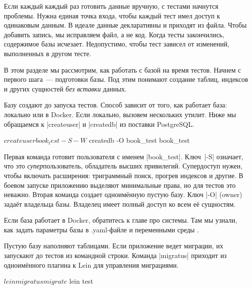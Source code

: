 Если каждый каждый раз готовить данные вручную, с тестами начнутся
проблемы. Нужна единая точка входа, чтобы каждый тест имел доступ к одинаковым
данным. В идеале данные декларативны и приходят из файла. Чтобы добавить запись,
мы исправляем файл, а не код. Когда тесты закончились, содержимое базы
исчезает. Недопустимо, чтобы тест зависел от изменений, выполненных в другом
тесте.

В этом разделе мы рассмотрим, как работать с базой на время тестов. Начнем с
первого шага~--- подготовки базы. Под этим понимают создание таблиц, индексов и
других сущностей \emph{без вставки} данных.


Базу создают до запуска тестов. Способ зависит от того, как работает база:
локально или в Docker. Если локально, вызовем нескольких утилит. Ниже мы
обращаемся к \spverb|createuser| и \spverb|createdb| из поставки PostgreSQL.

\begin{english}
  \begin{bash}
$ createuser book_test -S -W
$ createdb -O book_test book_test
  \end{bash}
\end{english}

Первая команда готовит пользователя с именем \spverb|book_test|.
Ключ~\spverb|-S| означает, что это \emph{супер}пользователь,
обладатель высших привилегий. Супердоступ нужен, чтобы включать расширения:
триграммный поиск, прогрев индексов и другие. В боевом запуске приложению
выделяют минимальные права, но для тестов это неважно. Вторая команда создает
одноим\"{е}нную пустую базу. Ключ \spverb|-O| (owner) зада\"{е}т владельца
базы. Владелец имеет полный доступ ко всем е\"{е} сущностям.


Если база работает в Docker, обратитесь к главе про системы. Там мы узнали, как
задать параметры базы в .yaml-файле и переменными среды .


Пустую базу наполняют таблицами. Если приложение ведет миграции, их запускают до
тестов из командной строки. Команда \spverb|migratus| приходит из
одноим\"{е}нного плагина к
Lein для управления миграциями.

\begin{english}
  \begin{clojure}
$ lein migratus migrate
$ lein test
  \end{clojure}
\end{english}

